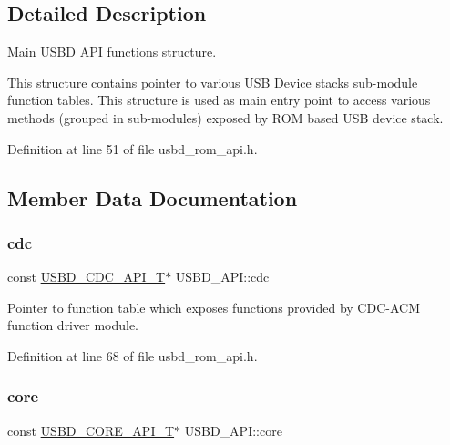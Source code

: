 \subsection{Detailed Description}
Main U\+S\+BD A\+PI functions structure.

This structure contains pointer to various U\+SB Device stack\textquotesingle{}s sub-\/module function tables. This structure is used as main entry point to access various methods (grouped in sub-\/modules) exposed by R\+OM based U\+SB device stack. 



Definition at line 51 of file usbd\+\_\+rom\+\_\+api.\+h.



\subsection{Member Data Documentation}
\mbox{\label{struct_u_s_b_d___a_p_i_a5560686e2f376096d2e1a640bb16bb84}} 
\subsubsection{\texorpdfstring{cdc}{cdc}}
{\footnotesize\ttfamily const \hyperlink{group___u_s_b_d___c_d_c_gaad7f61aed01ad4130bee0f50b17eb716}{U\+S\+B\+D\+\_\+\+C\+D\+C\+\_\+\+A\+P\+I\+\_\+T}$\ast$ U\+S\+B\+D\+\_\+\+A\+P\+I\+::cdc}

Pointer to function table which exposes functions provided by C\+D\+C-\/\+A\+CM function driver module. 

Definition at line 68 of file usbd\+\_\+rom\+\_\+api.\+h.

\mbox{\label{struct_u_s_b_d___a_p_i_a52b343de8166692bd2b4aecfb5eea59d}} 
\subsubsection{\texorpdfstring{core}{core}}
{\footnotesize\ttfamily const \hyperlink{group___u_s_b_d___core_ga6a53e8395d1c68f98d18ca4a49b75baa}{U\+S\+B\+D\+\_\+\+C\+O\+R\+E\+\_\+\+A\+P\+I\+\_\+T}$\ast$ U\+S\+B\+D\+\_\+\+A\+P\+I\+::core}

